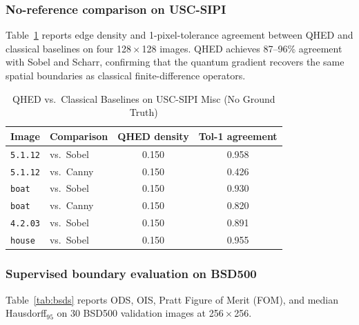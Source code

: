 \documentclass[journal]{IEEEtran}
\begin{document}
\subsubsection{No-reference comparison on USC-SIPI}

Table~\ref{tab:qhed_misc} reports edge density and 1-pixel-tolerance agreement
between QHED and classical baselines on four 128\,$\times$\,128 images.
QHED achieves 87--96\% agreement with Sobel and Scharr, confirming that the
quantum gradient recovers the same spatial boundaries as classical
finite-difference operators.

\begin{table}[!t]
\renewcommand{\arraystretch}{1.2}
\caption{QHED vs.\ Classical Baselines on USC-SIPI Misc (No Ground Truth)}
\label{tab:qhed_misc}
\centering
\begin{tabular}{llcc}
\toprule
Image & Comparison & QHED density & Tol-1 agreement \\
\midrule
\texttt{5.1.12} & vs.\ Sobel     & 0.150 & 0.958 \\
\texttt{5.1.12} & vs.\ Canny     & 0.150 & 0.426 \\
\texttt{boat}   & vs.\ Sobel     & 0.150 & 0.930 \\
\texttt{boat}   & vs.\ Canny     & 0.150 & 0.820 \\
\texttt{4.2.03} & vs.\ Sobel     & 0.150 & 0.891 \\
\texttt{house}  & vs.\ Sobel     & 0.150 & 0.955 \\
\bottomrule
\end{tabular}
\end{table}

\subsubsection{Supervised boundary evaluation on BSD500}

Table~\ref{tab:bsds} reports ODS, OIS, Pratt Figure of Merit (FOM), and
median Hausdorff$_{95}$ on 30 BSD500 validation images at 256\,$\times$\,256.
\end{document}
